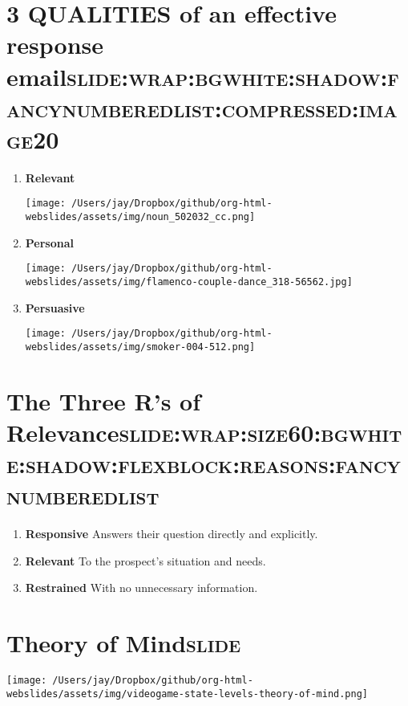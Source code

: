 \documentclass[12pt]{article}
\begin{document}
\section[\textbf{3 QUALITIES} of an effective response email]{\textbf{3 QUALITIES} of an effective response email\hfill{}\textsc{slide:wrap:bgwhite:shadow:fancynumberedlist:compressed:image20}}
\label{sec:org176806b}
\begin{enumerate}
\item \textbf{Relevant} \begin{center}
\texttt{[image: /Users/jay/Dropbox/github/org-html-webslides/assets/img/noun\_502032\_cc.png]}
\end{center}
\item \textbf{Personal} \begin{center}
\texttt{[image: /Users/jay/Dropbox/github/org-html-webslides/assets/img/flamenco-couple-dance\_318-56562.jpg]}
\end{center}
\item \textbf{Persuasive} \begin{center}
\texttt{[image: /Users/jay/Dropbox/github/org-html-webslides/assets/img/smoker-004-512.png]}
\end{center}
\end{enumerate}

\section[The Three R's of Relevance]{The Three R's of Relevance\hfill{}\textsc{slide:wrap:size60:bgwhite:shadow:flexblock:reasons:fancynumberedlist}}
\label{sec:orge297a8f}
\begin{enumerate}
\item \textbf{Responsive} Answers their question directly and explicitly.
\item \textbf{Relevant} To the prospect's situation and needs.
\item \textbf{Restrained} With no unnecessary information.
\end{enumerate}

\section[Theory of Mind]{Theory of Mind\hfill{}\textsc{slide}}
\label{sec:org231d041}
\begin{center}
\texttt{[image: /Users/jay/Dropbox/github/org-html-webslides/assets/img/videogame-state-levels-theory-of-mind.png]}
\end{center}
\end{document}
